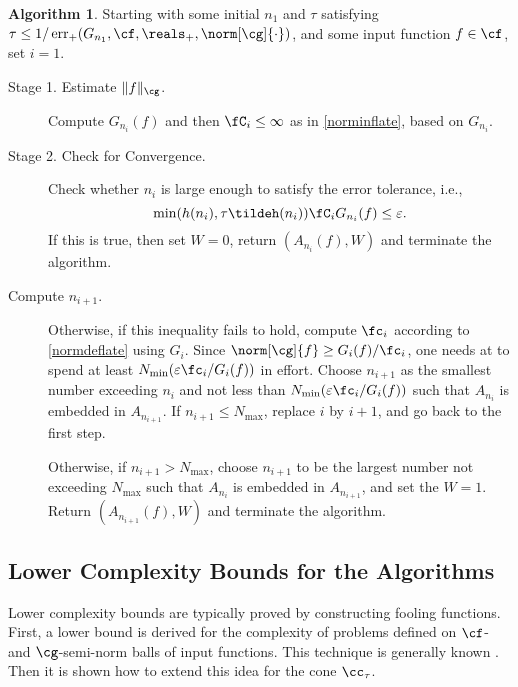 \documentclass[final]{elsarticle}
\DeclareMathOperator{\err}{err}
\theoremstyle{definition}
\newtheorem{algo}{Algorithm}
\theoremstyle{remark}
\begin{document}
\begin{algo} \label{multistagealgo}  Starting with some initial $n_1$ and $\tau$ satisfying $\tau \le 1/ \err_{+}(G_{n_1},\cf,\reals_+,\norm[\cg]{\cdot})$, and some input function $f \in \cf$, set $i=1$.
\begin{description}

\item [Stage 1. Estimate $\| f \| _{\cg}$.] Compute $G_{n_i}(f)$ and then $\fC_{i} \le \infty$ as in \eqref{norminflate}, based on $G_{n_i}$.  

\item [Stage 2. Check for Convergence.] Check whether $n_i$ is large enough to satisfy the error tolerance, i.e., 
\[
\min(h(n_i),\tau \tildeh(n_i))\fC_i G_{n_i}(f) \le \varepsilon.
\]
If this is true, then set $W=0$, return $(A_{n_i}(f),W)$ and terminate the algorithm.

\item[Compute $n_{i+1}$.]  Otherwise, if this inequality fails to hold, compute $\fc_i$ according to \eqref{normdeflate} using $G_i$. Since $\norm[\cg]{f} \ge G_i(f)/\fc_i$, one needs at to spend at least $N_{\min}(\varepsilon \fc_i/G_i(f))$ in effort.  Choose $n_{i+1}$ as the smallest number exceeding $n_i$ and not less than $N_{\min}(\varepsilon \fc_i/G_i(f))$ such that $A_{n_{i}}$ is embedded in $A_{n_{i+1}}$. If $n_{i+1} \le N_{\max}$, replace $i$ by $i+1$, and go back to the first step.  

Otherwise, if $n_{i+1} > N_{\max}$, choose $n_{i+1}$ to be the largest number not exceeding $N_{\max}$ such that $A_{n_{i}}$ is embedded in $A_{n_{i+1}}$, and set the $W=1$. Return $(A_{n_{i+1}}(f),W)$ and terminate the algorithm.
\end{description}  
\end{algo}

\subsection{Lower Complexity Bounds for the Algorithms}
Lower complexity bounds are typically proved by constructing fooling functions.  First, a lower bound is derived for the complexity of problems defined on $\cf$- and $\cg$-semi-norm balls of input functions.  This technique is generally known \cite{???}.  Then it is shown how to extend this idea for the cone $\cc_{\tau}$.  
\end{document}
